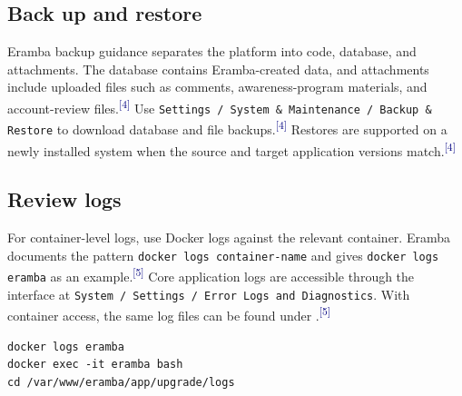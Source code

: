 \documentclass[10pt,letterpaper]{article}
\newcommand{\source}[1]{\textsuperscript{\textcolor{navy}{#1}}}
\begin{document}
\subsection{Back up and restore}
Eramba backup guidance separates the platform into code, database, and attachments. The database contains Eramba-created data, and attachments include uploaded files such as comments, awareness-program materials, and account-review files.\source{[4]} Use \texttt{Settings / System \& Maintenance / Backup \& Restore} to download database and file backups.\source{[4]} Restores are supported on a newly installed system when the source and target application versions match.\source{[4]}

\subsection{Review logs}
For container-level logs, use Docker logs against the relevant container. Eramba documents the pattern \texttt{docker logs container-name} and gives \texttt{docker logs eramba} as an example.\source{[5]} Core application logs are accessible through the interface at \texttt{System / Settings / Error Logs and Diagnostics}. With container access, the same log files can be found under .\source{[5]}

\begin{verbatim}
docker logs eramba
docker exec -it eramba bash
cd /var/www/eramba/app/upgrade/logs
\end{verbatim}
\end{document}
